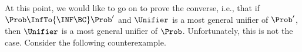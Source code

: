 %
%
%

At this point, we would like to go on to prove the converse, i.e., that if
$\Prob \InfTo{\INF\BC} \Prob'$ and $\Unifier$ is a most general unifier of
$\Prob'$, then $\Unifier$ is a most general unifier of $\Prob$. Unfortunately,
this is not the case. Consider the following counterexample.

